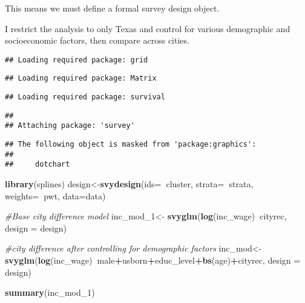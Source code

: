 \documentclass[]{article}
\newenvironment{Shaded}{\begin{snugshade}}{\end{snugshade}}
\newcommand{\KeywordTok}[1]{\textcolor[rgb]{0.13,0.29,0.53}{\textbf{#1}}}
\newcommand{\DataTypeTok}[1]{\textcolor[rgb]{0.13,0.29,0.53}{#1}}
\newcommand{\DecValTok}[1]{\textcolor[rgb]{0.00,0.00,0.81}{#1}}
\newcommand{\StringTok}[1]{\textcolor[rgb]{0.31,0.60,0.02}{#1}}
\newcommand{\CommentTok}[1]{\textcolor[rgb]{0.56,0.35,0.01}{\textit{#1}}}
\newcommand{\OperatorTok}[1]{\textcolor[rgb]{0.81,0.36,0.00}{\textbf{#1}}}
\newcommand{\NormalTok}[1]{#1}
\begin{document}
This means we must define a formal survey design object.

I restrict the analysis to only Texas and control for various
demographic and socioeconomic factors, then compare across cities.

\begin{Shaded}
\end{Shaded}

\begin{verbatim}
## Loading required package: grid
\end{verbatim}

\begin{verbatim}
## Loading required package: Matrix
\end{verbatim}

\begin{verbatim}
## Loading required package: survival
\end{verbatim}

\begin{verbatim}
## 
## Attaching package: 'survey'
\end{verbatim}

\begin{verbatim}
## The following object is masked from 'package:graphics':
## 
##     dotchart
\end{verbatim}

\begin{Shaded}
\begin{Highlighting}[]
\KeywordTok{library}\NormalTok{(splines)}
\NormalTok{design<-}\KeywordTok{svydesign}\NormalTok{(}\DataTypeTok{ids=}\OperatorTok{~}\NormalTok{cluster, }\DataTypeTok{strata=}\OperatorTok{~}\NormalTok{strata, }\DataTypeTok{weights=}\OperatorTok{~}\NormalTok{pwt, }\DataTypeTok{data=}\NormalTok{data)}

\CommentTok{#Base city difference model}
\NormalTok{inc_mod_}\DecValTok{1}\NormalTok{<-}\StringTok{ }\KeywordTok{svyglm}\NormalTok{(}\KeywordTok{log}\NormalTok{(inc_wage)}\OperatorTok{~}\NormalTok{cityrec,}
                 \DataTypeTok{design =}\NormalTok{ design)}

\CommentTok{#city difference after controlling for demographic factors}
\NormalTok{inc_mod<-}\StringTok{ }\KeywordTok{svyglm}\NormalTok{(}\KeywordTok{log}\NormalTok{(inc_wage)}\OperatorTok{~}\NormalTok{male}\OperatorTok{+}\NormalTok{usborn}\OperatorTok{+}\NormalTok{educ_level}\OperatorTok{+}\KeywordTok{bs}\NormalTok{(age)}\OperatorTok{+}\NormalTok{cityrec,}
                 \DataTypeTok{design =}\NormalTok{ design)}

\KeywordTok{summary}\NormalTok{(inc_mod_}\DecValTok{1}\NormalTok{)}
\end{Highlighting}
\end{Shaded}
\end{document}
